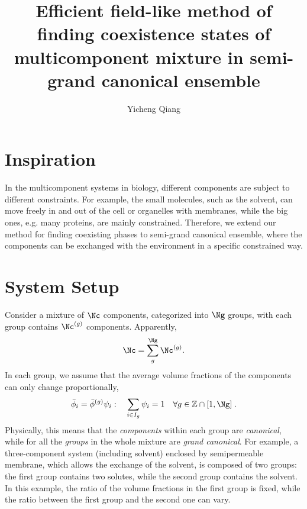 \documentclass[aps,prl,reprint,onecolumn,groupedaddress,amsmath,amssymb]{revtex4-2}
\newcommand{\bphi}{{\bar{\phi}}}
\begin{document}
\title{Efficient field-like method of finding coexistence states of multicomponent mixture in semi-grand canonical ensemble}

\author{Yicheng Qiang}

\maketitle
\tableofcontents

\section{Inspiration}
In the multicomponent systems in biology, different components are subject to different constraints.
For example, the small molecules, such as the solvent, can move freely in and out of the cell or organelles with membranes, while the big ones, e.g. many proteins, are mainly constrained.
Therefore, we extend our method for finding coexisting phases to semi-grand canonical ensemble, where the components can be exchanged with the environment in a specific constrained way.

\section{System Setup}
Consider a mixture of $\Nc$ components, categorized into $\Ng$ groups, with each group contains $\Nc^{(g)}$ components.
Apparently,
\begin{align}
    \Nc = \sum_{g}^{\Ng} \Nc^{(g)}.
\end{align}
In each group, we assume that the average volume fractions of the components can only change proportionally,
\begin{align}
    \bphi_i = \bphi^{(g)} \psi_i:  \quad \sum_{i \in I_g} \psi_i = 1 \quad \forall g \in \mathbb{Z} \cap [1,\Ng] \;.
\end{align}
Physically, this means that the \emph{components} within each group are \emph{canonical}, while for all the \emph{groups} in the whole mixture are \emph{grand canonical}.
For example, a three-component system (including solvent) enclosed by semipermeable membrane, which allows the exchange of the solvent, is composed of two groups: the first group contains two solutes, while the second group contains the solvent.
In this example, the ratio of the volume fractions in the first group is fixed, while the ratio between the first group and the second one can vary.
\end{document}
